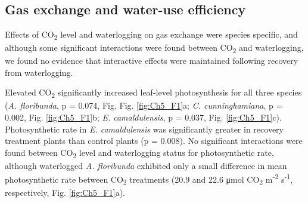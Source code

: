 \documentclass[12pt,a4paper]{memoir}
\begin{document}
\begin{landscape}
\begin{miniscule}
\begin{singlespacing}
{\begin{longtabu}
\caption[Treatment means, standard deviations and significance of ANOVA models.]{Mean and standard deviation (in parentheses) of measured gas exchange rates, biomass and functional traits for each combination of CO2 level and waterlogging treatments. Significant differences as determined by two-way ANOVA are denoted by the letters NS, C, W or I (NS = no significant effect of either treatment, C = significant effect of CO{\textsubscript{2}} level, W = significant effect of waterlogging treatment, C x W = significant interaction between CO{\textsubscript{2}} level and waterlogging treatment). Where interactions were found, waterlogging treatments in which significant differences between aCO{\textsubscript{2}} and eCO{\textsubscript{2}} were determined by post-hoc tests are denoted by: c = control, w = waterlogged, r = recovery. Significant differences between waterlogging treatments determined by post-hoc tests are denoted using the following script: cw = difference between control and waterlogged measurements, cr = difference between control and recovery measurements, wr = difference between waterlogged and recovery measurements. \newline* interaction effect was marginally significant, but post-hoc analysis confirmed significant differences among treatments.\newline N.B. biomass measurements for waterlogged plants are omitted because these plants were harvested at a younger age than control or recovery plants and are thus not comparable.} \\
\label{tab:Ch5_T2}
\end{longtabu}
}
\end{singlespacing}
\end{miniscule}
\end{landscape}

\subsection{Gas exchange and water-use efficiency}
Effects of CO\textsubscript{2} level and waterlogging on gas exchange were species specific, and although some significant interactions were found between CO\textsubscript{2} and waterlogging, we found no evidence that interactive effects were maintained following recovery from waterlogging. 

Elevated CO\textsubscript{2} significantly increased leaf-level photosynthesis for all three species (\textit{A. floribunda}, p = 0.074, Fig. Fig. \ref{fig:Ch5_F1}a; \textit{C. cunninghamiana}, p = 0.002, Fig. \ref{fig:Ch5_F1}b; \textit{E. camaldulensis}, p = 0.037, Fig. \ref{fig:Ch5_F1}c). Photosynthetic rate in \textit{E. camaldulensis} was significantly greater in recovery treatment plants than control plants (p = 0.008). No significant interactions were found between CO\textsubscript{2} level and waterlogging status for photosynthetic rate, although waterlogged \textit{A. floribunda} exhibited only a small difference in mean photosynthetic rate between CO\textsubscript{2} treatments (20.9 and 22.6 μmol CO\textsubscript{2} m\textsuperscript{-2} s\textsuperscript{-1}, respectively, Fig. \ref{fig:Ch5_F1}a).
\end{document}
